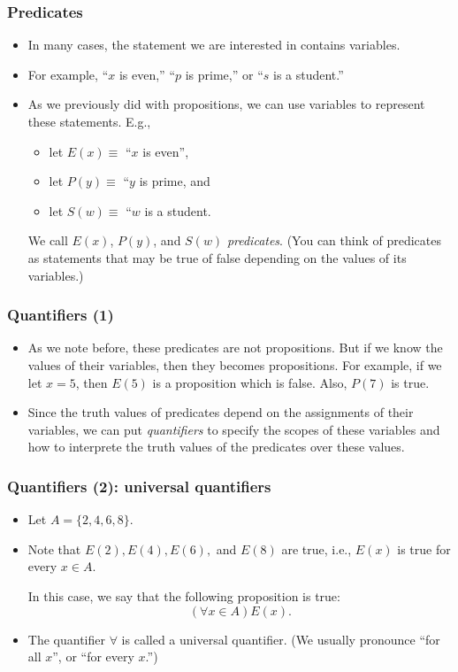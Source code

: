 \begin{frame}\frametitle{Predicates}
  \begin{itemize}
  \item
    In many cases, the statement we are interested in contains variables.

  \item
    For example, ``$x$ is even,'' ``$p$ is prime,'' or ``$s$ is a student.''
    \pause

  \item
    As we previously did with propositions, we can use variables to
    represent these statements.  E.g.,
    \begin{itemize}
    \item let $E(x)\equiv$ ``$x$ is even'',
    \item let $P(y)\equiv$ ``$y$ is prime, and
    \item let $S(w)\equiv$ ``$w$ is a student.
    \end{itemize}
    We call $E(x)$, $P(y)$, and $S(w)$ {\em predicates}. (You can
    think of predicates as statements that may be true of false
    depending on the values of its variables.)
  \end{itemize}
\end{frame}

\begin{frame}\frametitle{Quantifiers (1)}
  \begin{itemize}
  \item As we note before, these predicates are not propositions.  But
    if we know the values of their variables, then they becomes
    propositions.  For example, if we let $x=5$, then $E(5)$ is a
    proposition which is false.  Also, $P(7)$ is true.
  \item Since the truth values of predicates depend on the assignments
    of their variables, we can put {\em quantifiers} to specify the
    scopes of these variables and how to interprete the truth values of
    the predicates over these values.
  \end{itemize}
\end{frame}

\begin{frame}\frametitle{Quantifiers (2): universal quantifiers}
  \begin{itemize}
  \item Let $A=\{2,4,6,8\}$.
  \item Note that $E(2), E(4), E(6),$ and $E(8)$ are true, i.e.,
    $E(x)$ is true for every $x\in A$.  \pause
    
    In this case, we say that the following proposition is true:
    \[(\forall x\in A) E(x). \]
    \pause

  \item The quantifier $\forall$ is called a universal quantifier.
    (We usually pronounce ``for all $x$'', or ``for every $x$.'')

  \end{itemize}
\end{frame}

